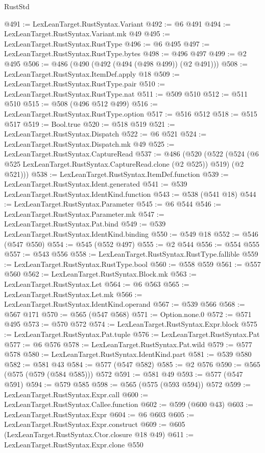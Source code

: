 \begin{lexlean}{RustStd}
\begin{coremodule}
{\begin{coremodule}
{{{{{{{{{{{{{@491 := LexLeanTarget.RustSyntax.Variant
@492 := @6 @491
@494 := LexLeanTarget.RustSyntax.Variant.mk @49
@495 := LexLeanTarget.RustSyntax.RustType
@496 := @6 @495
@497 := LexLeanTarget.RustSyntax.RustType.bytes
@498 := @496 @497
@499 := @2 @495
@506 := @486 (@490 (@492 (@494 (@498 @499)) (@2 @491)))
@508 := LexLeanTarget.RustSyntax.ItemDef.apply @18
@509 := LexLeanTarget.RustSyntax.RustType.pair
@510 := LexLeanTarget.RustSyntax.RustType.nat
@511 := @509 @510
@512 := @511 @510
@515 := @508 (@496 @512 @499)
@516 := LexLeanTarget.RustSyntax.RustType.option
@517 := @516 @512
@518 := @515 @517
@519 := Bool.true
@520 := @518 @519
@521 := LexLeanTarget.RustSyntax.Dispatch
@522 := @6 @521
@524 := LexLeanTarget.RustSyntax.Dispatch.mk @49
@525 := LexLeanTarget.RustSyntax.CaptureRead
@537 := @486
    (@520
      (@522 (@524 (@6 @525 LexLeanTarget.RustSyntax.CaptureRead.clone (@2 @525)) @519) (@2 @521)))
@538 := LexLeanTarget.RustSyntax.ItemDef.function
@539 := LexLeanTarget.RustSyntax.Ident.generated
@541 := @539 LexLeanTarget.RustSyntax.IdentKind.function
@543 := @538 (@541 @18)
@544 := LexLeanTarget.RustSyntax.Parameter
@545 := @6 @544
@546 := LexLeanTarget.RustSyntax.Parameter.mk
@547 := LexLeanTarget.RustSyntax.Pat.bind
@549 := @539 LexLeanTarget.RustSyntax.IdentKind.binding
@550 := @549 @18
@552 := @546 (@547 @550)
@554 := @545 (@552 @497)
@555 := @2 @544
@556 := @554 @555
@557 := @543 @556
@558 := LexLeanTarget.RustSyntax.RustType.fallible
@559 := LexLeanTarget.RustSyntax.RustType.bool
@560 := @558 @559
@561 := @557 @560
@562 := LexLeanTarget.RustSyntax.Block.mk
@563 := LexLeanTarget.RustSyntax.Let
@564 := @6 @563
@565 := LexLeanTarget.RustSyntax.Let.mk
@566 := LexLeanTarget.RustSyntax.IdentKind.operand
@567 := @539 @566
@568 := @567 @171
@570 := @565 (@547 @568)
@571 := Option.none.{0}
@572 := @571 @495
@573 := @570 @572
@574 := LexLeanTarget.RustSyntax.Expr.block
@575 := LexLeanTarget.RustSyntax.Pat.tuple
@576 := LexLeanTarget.RustSyntax.Pat
@577 := @6 @576
@578 := LexLeanTarget.RustSyntax.Pat.wild
@579 := @577 @578
@580 := LexLeanTarget.RustSyntax.IdentKind.part
@581 := @539 @580
@582 := @581 @43
@584 := @577 (@547 @582)
@585 := @2 @576
@590 := @565 (@575 (@579 (@584 @585))) @572
@591 := @581 @49
@593 := @577 (@547 @591)
@594 := @579 @585
@598 := @565 (@575 (@593 @594)) @572
@599 := LexLeanTarget.RustSyntax.Expr.call
@600 := LexLeanTarget.RustSyntax.Callee.function
@602 := @599 (@600 @43)
@603 := LexLeanTarget.RustSyntax.Expr
@604 := @6 @603
@605 := LexLeanTarget.RustSyntax.Expr.construct
@609 := @605 (LexLeanTarget.RustSyntax.Ctor.closure @18 @49)
@611 := LexLeanTarget.RustSyntax.Expr.clone @550
}}}}}}}}}}}}}
\end{coremodule}}
\end{coremodule}
\end{lexlean}

